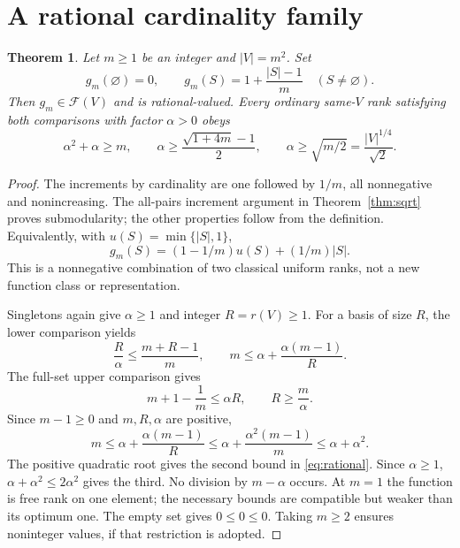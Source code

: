\documentclass[11pt]{article}
\newtheorem{theorem}{Theorem}
\newcommand{\emptysetv}{\varnothing}
\begin{document}
\section{A rational cardinality family}
\begin{theorem}\label{thm:rational}
Let $m\ge1$ be an integer and $|V|=m^2$. Set
\[
 g_m(\emptysetv)=0,\qquad g_m(S)=1+\frac{|S|-1}{m}\quad(S\ne\emptysetv).
\]
Then $g_m\in\mathcal F(V)$ and is rational-valued. Every ordinary same-$V$ rank satisfying both comparisons with factor $\alpha>0$ obeys
\begin{equation}\label{eq:rational}
 \alpha^2+\alpha\ge m,\qquad
 \alpha\ge\frac{\sqrt{1+4m}-1}{2},\qquad
 \alpha\ge\sqrt{m/2}=\frac{|V|^{1/4}}{\sqrt2}.
\end{equation}
\end{theorem}
\begin{proof}
The increments by cardinality are one followed by $1/m$, all nonnegative and nonincreasing. The all-pairs increment argument in Theorem~\ref{thm:sqrt} proves submodularity; the other properties follow from the definition. Equivalently, with $u(S)=\min\{|S|,1\}$,
\begin{equation}\label{eq:rank-sum}
 g_m(S)=(1-1/m)u(S)+(1/m)|S|.
\end{equation}
This is a nonnegative combination of two classical uniform ranks, not a new function class or representation.

Singletons again give $\alpha\ge1$ and integer $R=r(V)\ge1$. For a basis of size $R$, the lower comparison yields
\[
 \frac R\alpha\le\frac{m+R-1}{m},\qquad
 m\le\alpha+\frac{\alpha(m-1)}R.
\]
The full-set upper comparison gives
\[
 m+1-\frac1m\le\alpha R,\qquad R\ge\frac m\alpha.
\]
Since $m-1\ge0$ and $m,R,\alpha$ are positive,
\[
 m\le\alpha+\frac{\alpha(m-1)}R
 \le\alpha+\frac{\alpha^2(m-1)}m\le\alpha+\alpha^2.
\]
The positive quadratic root gives the second bound in \eqref{eq:rational}. Since $\alpha\ge1$, $\alpha+\alpha^2\le2\alpha^2$ gives the third. No division by $m-\alpha$ occurs. At $m=1$ the function is free rank on one element; the necessary bounds are compatible but weaker than its optimum one. The empty set gives $0\le0\le0$. Taking $m\ge2$ ensures noninteger values, if that restriction is adopted.
\end{proof}
\end{document}

